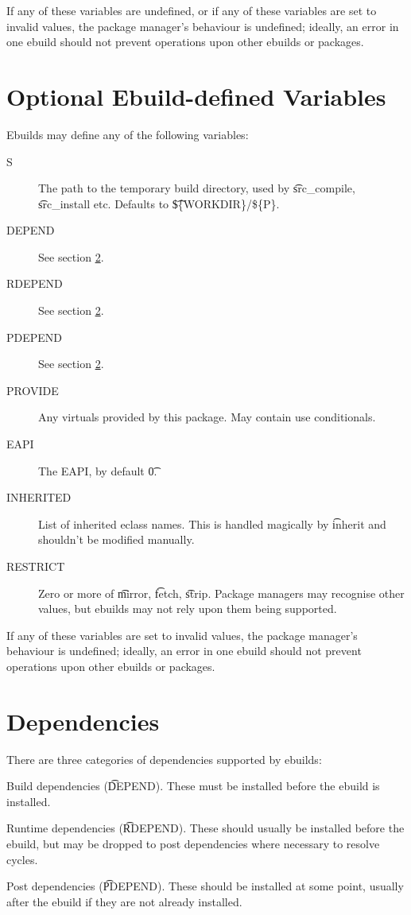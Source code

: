 If any of these variables are undefined, or if any of these variables are set to invalid values,
the package manager's behaviour is undefined; ideally, an error in one ebuild should not prevent
operations upon other ebuilds or packages.

\section{Optional Ebuild-defined Variables}

Ebuilds may define any of the following variables:

\begin{description}
\item[S] The path to the temporary build directory, used by \t{src\_compile}, \t{src\_install}
    etc. Defaults to \t{\$\{WORKDIR\}/\$\{P\}}.
\item[DEPEND] See section \ref{dependencies}.
\item[RDEPEND] See section \ref{dependencies}.
\item[PDEPEND] See section \ref{dependencies}.
\item[PROVIDE] Any  virtuals provided by this package. May contain use conditionals.
    \label{ebuild-var-provide}
\item[EAPI] The EAPI, by default \t{0}.
\item[INHERITED] List of inherited eclass names. This is handled magically by \t{inherit} and
    shouldn't be modified manually.
\item[RESTRICT] Zero or more of \t{mirror}, \t{fetch}, \t{strip}. Package managers may recognise
    other values, but ebuilds may not rely upon them being supported.
\end{description}

If any of these variables are set to invalid values, the package manager's behaviour is undefined;
ideally, an error in one ebuild should not prevent operations upon other ebuilds or packages.

\section{Dependencies}
\label{dependencies}

There are three categories of dependencies supported by ebuilds:

\begin{bulletlist}
\item Build dependencies (\t{DEPEND}). These must be installed before the ebuild is installed.
\item Runtime dependencies (\t{RDEPEND}). These should usually be installed before the ebuild,
    but may be dropped to post dependencies where necessary to resolve cycles.
\item Post dependencies (\t{PDEPEND}). These should be installed at some point, usually after
    the ebuild if they are not already installed.
\end{bulletlist}

